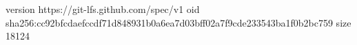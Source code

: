 version https://git-lfs.github.com/spec/v1
oid sha256:cc92bfcdaefccdf71d848931b0a6ea7d03bff02a7f9cde233543ba1f0b2bc759
size 18124
